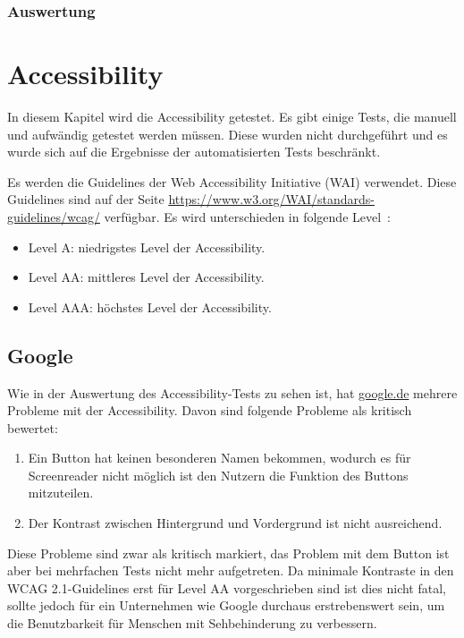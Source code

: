 \subsubsection*{Auswertung}

\section{Accessibility}\label{sec:accessibility}
In diesem Kapitel wird die Accessibility getestet.
Es gibt einige Tests, die manuell und aufwändig getestet werden müssen.
Diese wurden nicht durchgeführt und es wurde sich auf die Ergebnisse der automatisierten Tests beschränkt.

Es werden die Guidelines der Web Accessibility Initiative (WAI) verwendet.
Diese Guidelines sind auf der Seite \url{https://www.w3.org/WAI/standards-guidelines/wcag/} verfügbar.\newline
Es wird unterschieden in folgende Level~\cite{WCAG21}:
\begin{itemize}
    \item Level A: niedrigstes Level der Accessibility.
    \item Level AA: mittleres Level der Accessibility.
    \item Level AAA: höchstes Level der Accessibility.
\end{itemize}


\subsection{Google}\label{subsec:google}
Wie in der Auswertung des Accessibility-Tests zu sehen ist, hat \url{google.de} mehrere Probleme mit der Accessibility.
Davon sind folgende Probleme als kritisch bewertet:
\begin{enumerate}
    \item Ein Button hat keinen besonderen Namen bekommen, wodurch es für Screenreader nicht möglich ist den Nutzern die Funktion des Buttons mitzuteilen.
    \item Der Kontrast zwischen Hintergrund und Vordergrund ist nicht ausreichend.
\end{enumerate}
Diese Probleme sind zwar als kritisch markiert, das Problem mit dem Button ist aber bei mehrfachen Tests nicht mehr aufgetreten.
Da minimale Kontraste in den WCAG 2.1-Guidelines erst für Level AA vorgeschrieben sind ist dies nicht fatal, sollte jedoch für ein Unternehmen wie Google durchaus erstrebenswert sein,
um die Benutzbarkeit für Menschen mit Sehbehinderung zu verbessern.

